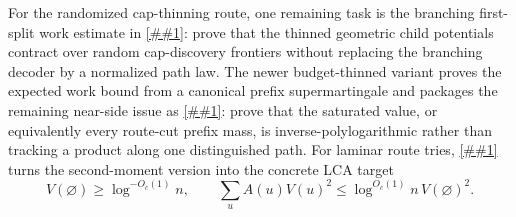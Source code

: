 \documentclass[10pt]{article}
\newcommand{\cref}[1]{\ref{##1}}
\theoremstyle{definition}
\begin{document}
For the randomized cap-thinning route, one remaining task is the branching first-split work estimate in \cref{asm:mixed-continuation-operator}: prove that the thinned geometric child potentials contract over random cap-discovery frontiers without replacing the branching decoder by a normalized path law. The newer budget-thinned variant proves the expected work bound from a canonical prefix supermartingale and packages the remaining near-side issue as \cref{asm:aggregate-value-delivery}: prove that the saturated value, or equivalently every route-cut prefix mass, is inverse-polylogarithmic rather than tracking a product along one distinguished path. For laminar route tries, \cref{lem:lca-value-flow} turns the second-moment version into the concrete LCA target
\[
   V(\varnothing)\ge\log^{-O_c(1)}n,
   \qquad
   \sum_uA(u)V(u)^2
   \le
   \log^{O_c(1)}n\,V(\varnothing)^2 .
\]
\end{document}
